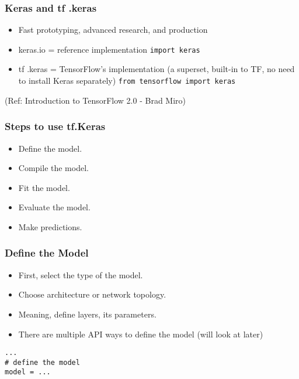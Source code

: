 \begin{frame}[fragile] \frametitle{Keras and tf .keras}

\begin{itemize}
\item  Fast prototyping, advanced research, and production
\item keras.io = reference implementation \lstinline|import keras|
\item tf .keras  = TensorFlow’s implementation (a superset, built-in to TF, no need to install Keras separately) \lstinline|from tensorflow import keras|
\end{itemize}
\tiny{(Ref: Introduction to TensorFlow 2.0 - Brad Miro)}
\end{frame}

\begin{frame}[fragile] \frametitle{Steps to use tf.Keras}

\begin{itemize}
\item  Define the model.
\item  Compile the model.
\item  Fit the model.
\item  Evaluate the model.
\item  Make predictions.
\end{itemize}
\end{frame}

\begin{frame}[fragile] \frametitle{Define the Model}

\begin{itemize}
\item  First, select the type of the model.
\item Choose architecture or network topology.
\item Meaning, define layers, its parameters.
\item There are multiple API ways to define the model (will look at later)
\end{itemize}

\begin{lstlisting}
...
# define the model
model = ...
\end{lstlisting}
\end{frame}

